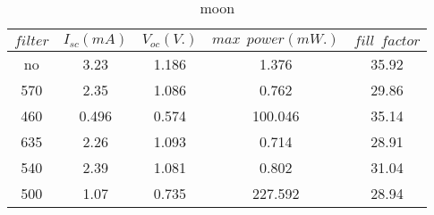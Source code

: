 \begin{table}[h]

\caption{moon}
\begin{tabular}{|c|c|c|c|c|}
$filter$ & $I_{s c}(m A)$ & $V_{o c}(V.)$ & $max \ \ power(m W.)$ & $fill \ \ factor$    \\ \hline
no   & 3.23  & 1.186 & 1.376   & 35.92 \\
570  & 2.35  & 1.086 & 0.762   & 29.86 \\
460  & 0.496 & 0.574 & 100.046 & 35.14 \\
635  & 2.26  & 1.093 & 0.714   & 28.91 \\
540  & 2.39  & 1.081 & 0.802   & 31.04 \\
500  & 1.07  & 0.735 & 227.592 & 28.94
\end{tabular}

\end{table}